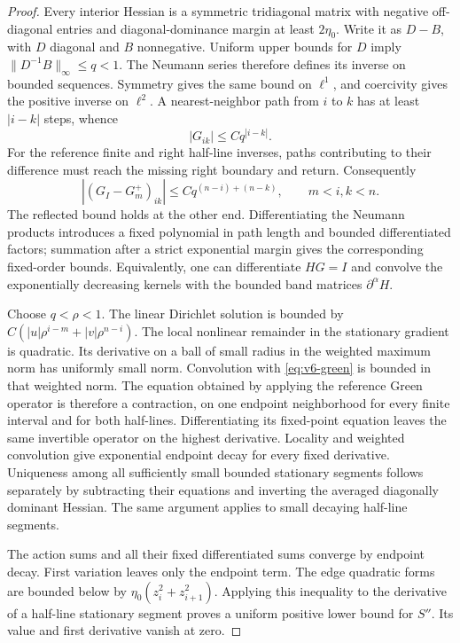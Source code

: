 \begin{proof}
Every interior Hessian is a symmetric tridiagonal matrix with negative
off-diagonal entries and diagonal-dominance margin at least $2\eta_0$.
Write it as $D-B$, with $D$ diagonal and $B$ nonnegative. Uniform upper
bounds for $D$ imply $\|D^{-1}B\|_\infty\le q<1$. The Neumann series
therefore defines its inverse on bounded sequences. Symmetry gives the
same bound on $\ell^1$, and coercivity gives the positive inverse on
$\ell^2$. A nearest-neighbor path from $i$ to $k$ has at least
$|i-k|$ steps, whence
\begin{equation}\label{eq:v6-green}
 |G_{ik}|\le Cq^{|i-k|}.
\end{equation}
For the reference finite and right half-line inverses, paths contributing
to their difference must reach the missing right boundary and return.
Consequently
\begin{equation}\label{eq:v6-green-comparison}
 |(G_I-G_m^+)_{ik}|\le Cq^{(n-i)+(n-k)},\qquad m<i,k<n.
\end{equation}
The reflected bound holds at the other end. Differentiating the
Neumann products introduces a fixed polynomial in path length and
bounded differentiated factors; summation after a strict exponential
margin gives the corresponding fixed-order bounds. Equivalently, one
can differentiate $HG=I$ and convolve the exponentially decreasing
kernels with the bounded band matrices $\partial^\alpha H$.

Choose $q<\rho<1$. The linear Dirichlet solution is bounded by
$C(|u|\rho^{i-m}+|v|\rho^{n-i})$. The local nonlinear remainder in the
stationary gradient is quadratic. Its derivative on a ball of small
radius in the weighted maximum norm has uniformly small norm.
Convolution with \eqref{eq:v6-green} is bounded in that weighted norm.
The equation obtained by applying the reference Green operator is
therefore a contraction, on one endpoint neighborhood for every finite
interval and for both half-lines. Differentiating its fixed-point
equation leaves the same invertible operator on the highest derivative.
Locality and weighted convolution give exponential endpoint decay for
every fixed derivative. Uniqueness among all sufficiently small bounded
stationary segments follows separately by subtracting their equations
and inverting the averaged diagonally dominant Hessian. The same
argument applies to small decaying half-line segments.

The action sums and all their fixed differentiated sums converge by
endpoint decay. First variation leaves only the endpoint term. The
edge quadratic forms are bounded below by
$\eta_0(z_i^2+z_{i+1}^2)$. Applying this inequality to the derivative
of a half-line stationary segment proves a uniform positive lower bound
for $S''$. Its value and first derivative vanish at zero.


\end{proof}
